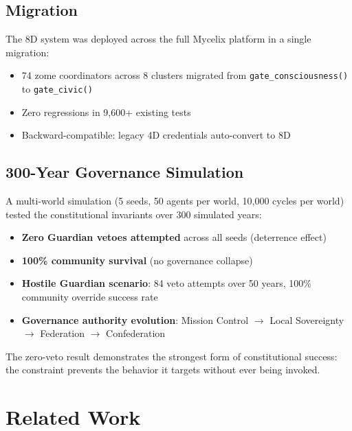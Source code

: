 \documentclass[11pt,twocolumn]{article}
\begin{document}
\subsection{Migration}

The 8D system was deployed across the full Mycelix platform in a single migration:
\begin{itemize}[nosep]
  \item 74 zome coordinators across 8 clusters migrated from \texttt{gate\_consciousness()} to \texttt{gate\_civic()}
  \item Zero regressions in 9,600+ existing tests
  \item Backward-compatible: legacy 4D credentials auto-convert to 8D
\end{itemize}

\subsection{300-Year Governance Simulation}

A multi-world simulation (5 seeds, 50 agents per world, 10,000 cycles per world) tested the constitutional invariants over 300 simulated years:

\begin{itemize}[nosep]
  \item \textbf{Zero Guardian vetoes attempted} across all seeds (deterrence effect)
  \item \textbf{100\% community survival} (no governance collapse)
  \item \textbf{Hostile Guardian scenario}: 84 veto attempts over 50 years, 100\% community override success rate
  \item \textbf{Governance authority evolution}: Mission Control $\to$ Local Sovereignty $\to$ Federation $\to$ Confederation
\end{itemize}

The zero-veto result demonstrates the strongest form of constitutional success: the constraint prevents the behavior it targets without ever being invoked.

\section{Related Work}
\label{sec:related}
\end{document}

